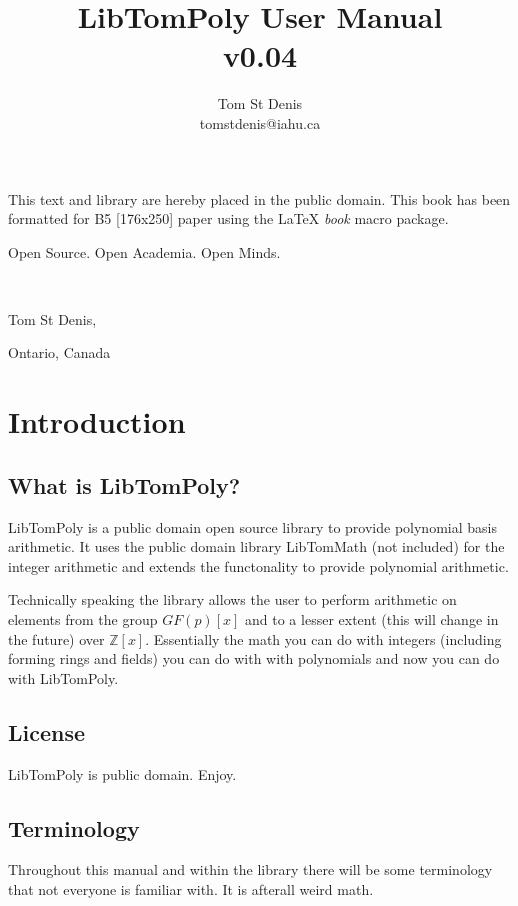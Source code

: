 \documentclass[b5paper]{book}
\def\Z{{\mathbb Z}}
\begin{document}
\frontmatter
\pagestyle{empty}
\title{LibTomPoly User Manual \\ v0.04}
\author{Tom St Denis \\ tomstdenis@iahu.ca}
\maketitle
This text and library are  hereby placed in the public domain.  This book has been 
formatted for B5 [176x250] paper using the \LaTeX{} {\em book} macro package.

\vspace{10cm}

\begin{flushright}Open Source.  Open Academia.  Open Minds.

\mbox{ }

Tom St Denis,

Ontario, Canada
\end{flushright}

\tableofcontents
\listoffigures
\mainmatter
\pagestyle{headings}
\chapter{Introduction}
\section{What is LibTomPoly?}
LibTomPoly is a public domain open source library to provide polynomial basis arithmetic.  It uses the public domain
library LibTomMath (not included) for the integer arithmetic and extends the functonality to provide polynomial arithmetic.

Technically speaking the library allows the user to perform arithmetic on elements from the group $GF(p)[x]$ and to 
a lesser extent (this will change in the future) over $\Z[x]$.  Essentially the math you can do with integers (including
forming rings and fields) you can do with with polynomials and now you can do with LibTomPoly.

\section{License}
LibTomPoly is public domain.  Enjoy.

\section{Terminology}
Throughout this manual and within the library there will be some terminology that not everyone is familiar with.  It is afterall
weird math.
\end{document}
